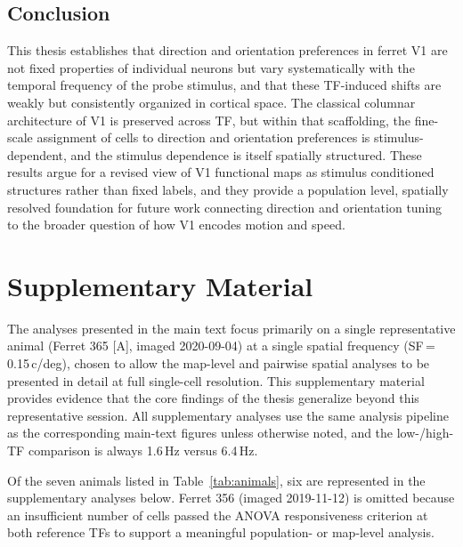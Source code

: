 \documentclass{brandeis-thesis3.3}
\begin{document}
\section{Conclusion}

This thesis establishes that direction and orientation
preferences in ferret V1 are not fixed properties of individual
neurons but vary systematically with the temporal frequency
of the probe stimulus, and that these TF-induced shifts are
weakly but consistently organized in cortical space. The
classical columnar architecture of V1 is preserved across TF,
but within that scaffolding, the fine-scale assignment of
cells to direction and orientation preferences is
stimulus-dependent, and the stimulus dependence is itself
spatially structured. These results argue for a revised view
of V1 functional maps as stimulus conditioned structures
rather than fixed labels, and they provide a population level,
spatially resolved foundation for future work connecting
direction and orientation tuning to the broader question of
how V1 encodes motion and speed.



\begin{singlespacing}


\end{singlespacing}


\appendix
\chapter{Supplementary Material}

The analyses presented in the main text focus primarily on a
single representative animal (Ferret 365 [A], imaged 2020-09-04)
at a single spatial frequency (SF\,=\,0.15\,c/deg), chosen to
allow the map-level and pairwise spatial analyses to be
presented in detail at full single-cell resolution. This
supplementary material provides evidence that the core findings
of the thesis generalize beyond this representative session. All
supplementary analyses use the same analysis pipeline as the
corresponding main-text figures unless otherwise noted, and the
low-/high-TF comparison is always 1.6\,Hz versus 6.4\,Hz.

Of the seven animals listed in Table~\ref{tab:animals}, six are
represented in the supplementary analyses below. Ferret 356
(imaged 2019-11-12) is omitted because an insufficient number
of cells passed the ANOVA responsiveness criterion at both
reference TFs to support a meaningful population- or map-level
analysis.
\end{document}
